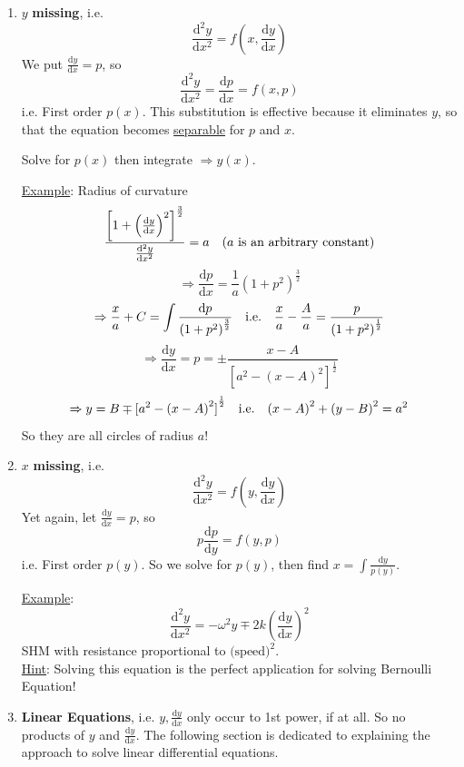 \documentclass[12pt]{report}
\theoremstyle{definition}
\begin{document}
\begin{enumerate}[label = (\alph*)]
\item $y$ \textbf{missing}, i.e. \[
        \frac{\mathrm{d}^{2}y}{\mathrm{d}x^{2}} = f\left(x, \frac{\mathrm{d}y}{\mathrm{d}x} \right) 
\]We put $\frac{\mathrm{d}y}{\mathrm{d}x} = p$, so\[
\frac{\mathrm{d}^{2}y}{\mathrm{d}x^{2}} = \frac{\mathrm{d}p}{\mathrm{d}x} = f\left(x, p\right) 
\]
i.e. First order $p(x)$. This substitution is effective because it eliminates $y$,
so that the equation becomes \underline{separable} for $p$ and $x$.

Solve for $p(x)$ then integrate $\Rightarrow y(x)$.

\underline{Example}: Radius of curvature \[
    \frac{{\left[1 + {\left(\frac{\mathrm{d}y}{\mathrm{d}x} \right)}^{2}\right]}^{\frac{3}{2}}}
    {\frac{\mathrm{d}^{2}y}{\mathrm{d}x^{2}} } = a \quad \textnormal{($a$ is an arbitrary constant)}
\]\[
\Rightarrow \frac{\mathrm{d}p}{\mathrm{d}x} = \frac{1}{a}{(1 + p^{2})}^{\frac{3}{2}}
\]\[
\Rightarrow \frac{x}{a} + C = \int \frac{\mathrm{d}p}{{(1 + p^{2})}^{\frac{3}{2}}} \quad 
\textnormal{i.e.} \quad \frac{x}{a} - \frac{A}{a} = \frac{p}{{(1 + p^{2})}^{\frac{1}{2}}}
\]\[
    \Rightarrow \frac{\mathrm{d}y}{\mathrm{d}x} = p 
    = \pm \frac{x - A}{{[a^{2} - {(x - A)}^{2}]}^{\frac{1}{2}}}
\]\[
\Rightarrow y = B \mp {[a^{2} - {(x - A)}^{2}]}^{\frac{1}{2}} \quad
\textnormal{i.e.} \quad {(x-A)}^{2} + {(y-B)}^{2} = a^{2}
\]
So they are all circles of radius $a$!

\item $x$ \textbf{missing}, i.e.\[
        \frac{\mathrm{d}^{2}y}{\mathrm{d}x^{2}} = f\left(y, \frac{\mathrm{d}y}{\mathrm{d}x} \right)
        \]Yet again, let $\frac{\mathrm{d}y}{\mathrm{d}x} = p$, so\[
p \frac{\mathrm{d}p}{\mathrm{d}y} = f(y, p)
\]
i.e. First order $p(y)$. So we solve for $p(y)$, then find $x = \int \frac{\mathrm{d}y}{p(y)}$.

\underline{Example}: \[
    \frac{\mathrm{d}^{2}y}{\mathrm{d}x^{2}} = -\omega^{2}y \mp 2k{\left(\frac{\mathrm{d}y}{\mathrm{d}x} \right)}^{2}
\]SHM with resistance proportional to $\text{(speed)}^{2}$.
\\\underline{Hint}: Solving this equation is the perfect application for solving Bernoulli Equation!

\item \textbf{Linear Equations}, i.e. $y, \frac{\mathrm{d}y}{\mathrm{d}x} $
    only occur to 1st power, if at all.
    So no products of $y$ and $\frac{\mathrm{d}y}{\mathrm{d}x} $.
    The following section is dedicated to explaining the approach to solve linear differential equations.
\end{enumerate}
\end{document}
